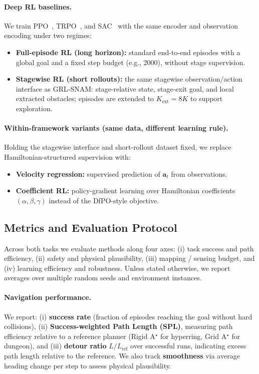 \documentclass{article} %
\begin{document}
\paragraph{Deep RL baselines.}
We train PPO~\citep{schulman2017ppo}, TRPO~\citep{schulman2015trust}, and SAC~\citep{haarnoja2018sac} with the same encoder and observation encoding under two regimes:
\begin{itemize}
    \item \textbf{Full-episode RL (long horizon):} standard end-to-end episodes with a global goal and a fixed step budget (e.g., 2000), without stage supervision.
    \item \textbf{Stagewise RL (short rollouts):} the same stagewise observation/action interface as GRL-SNAM: stage-relative state, stage-exit goal, and local extracted obstacles; episodes are extended to $K_{\mathrm{ext}}=8K$ to support exploration.
\end{itemize}

\paragraph{Within-framework variants (same data, different learning rule).}
Holding the stagewise interface and short-rollout dataset fixed, we replace Hamiltonian-structured supervision with:
\begin{itemize}
    \item \textbf{Velocity regression:} supervised prediction of $\mathbf{a}_t$ from observations.
    \item \textbf{Coefficient RL:} policy-gradient learning over Hamiltonian coefficients $(\alpha,\beta,\gamma)$ instead of the DfPO-style objective.
\end{itemize}


\subsection{Metrics and Evaluation Protocol}
\label{subsec:metrics_protocol}

Across both tasks we evaluate methods along four axes:
(i) task success and path efficiency,
(ii) safety and physical plausibility,
(iii) mapping / sensing budget, and
(iv) learning efficiency and robustness.
Unless stated otherwise, we report averages over multiple random seeds and environment instances.

\paragraph{Navigation performance.}
We report:
(i) \textbf{success rate} (fraction of episodes reaching the goal without hard collisions),
(ii) \textbf{Success-weighted Path Length (SPL)}, measuring path efficiency relative to a reference planner (Rigid A$^{\star}$ for hyperring, Grid A$^{\star}$ for dungeon),
and (iii) \textbf{detour ratio} $L / L_{\mathrm{ref}}$ over successful runs, indicating excess path length relative to the reference. We also track \textbf{smoothness} via average heading change per step to assess physical plausibility.
\end{document}
